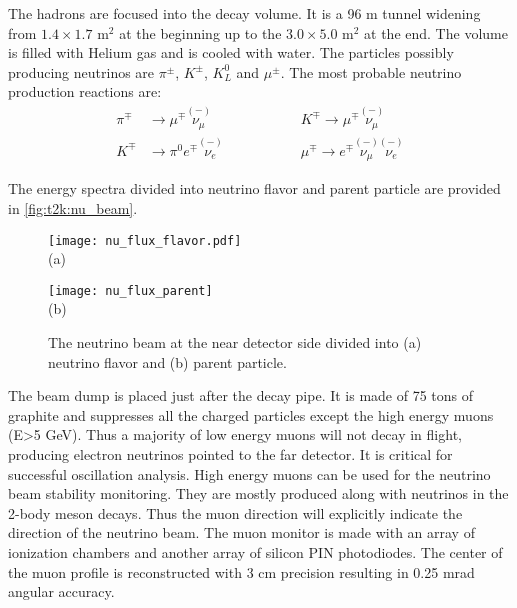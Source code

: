\documentclass[../main.tex]{subfiles}
\begin{document}
The hadrons are focused into the decay volume. It is a 96 m tunnel widening from $1.4\times1.7\text{ m}^2$ at the beginning up to the $3.0\times5.0 \text{ m}^2$ at the end. The volume is filled with Helium gas and is cooled with water. The particles possibly producing neutrinos are $\pi^\pm$, $K^\pm$, $K^0_L$ and $\mu^\pm$. The most probable neutrino production reactions are:
\begin{align}
\pi^\mp&\to\mu^\mp\overset{\scriptscriptstyle(-)}{\nu_\mu} \hspace{2cm} &K^\mp\to\mu^\mp\overset{\scriptscriptstyle(-)}{\nu_\mu} \\
K^\mp&\to\pi^0e^\mp\overset{\scriptscriptstyle(-)}{\nu_e} \hspace{2cm}  &\mu^\mp\to e^\mp\overset{\scriptscriptstyle(-)}{\nu_\mu}\overset{\scriptscriptstyle(-)}{\nu_e}
\end{align}

The energy spectra divided into neutrino flavor and parent particle are provided in \autoref{fig:t2k:nu_beam}.

\begin{figure}[!ht]
  \begin{minipage}{0.49\linewidth}
    \centering
    \texttt{[image: nu\_flux\_flavor.pdf]} \\ (a)
  \end{minipage}
  \begin{minipage}{0.49\linewidth}
    \centering
    \texttt{[image: nu\_flux\_parent]} \\ (b)
  \end{minipage}
  \caption{The neutrino beam at the near detector side divided into (a) neutrino flavor and (b) parent particle.}
  \label{fig:t2k:nu_beam}
\end{figure}

The beam dump is placed just after the decay pipe. It is made of 75 tons of graphite and suppresses all the charged particles except the high energy muons (E>5 GeV). Thus a majority of low energy muons will not decay in flight, producing electron neutrinos pointed to the far detector. It is critical for successful oscillation analysis. High energy muons can be used for the neutrino beam stability monitoring. They are mostly produced along with neutrinos in the 2-body meson decays. Thus the muon direction will explicitly indicate the direction of the neutrino beam. The muon monitor is made with an array of ionization chambers and another array of silicon PIN photodiodes. The center of the muon profile is reconstructed with 3 cm precision resulting in 0.25 mrad angular accuracy.
\end{document}
